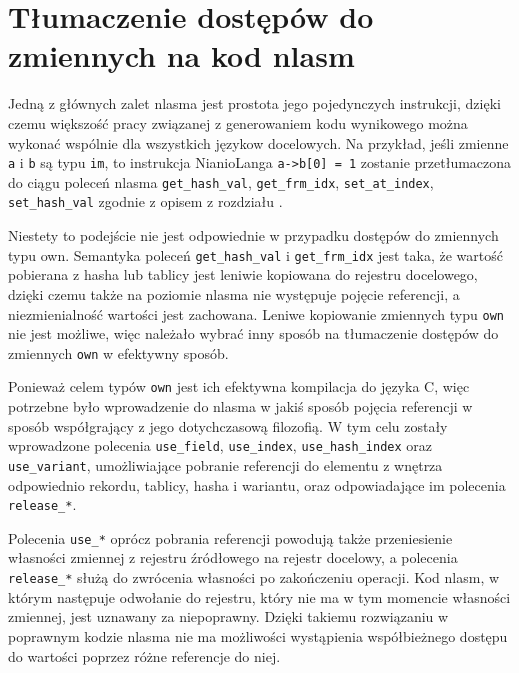 \documentclass[licencjacka]{pracamgr}
\begin{document}
\section{Tłumaczenie dostępów do zmiennych na kod nlasm}
Jedną z głównych zalet nlasma jest prostota jego pojedynczych instrukcji, dzięki czemu większość
pracy związanej z generowaniem kodu wynikowego można wykonać wspólnie dla wszystkich językow docelowych.
Na przykład, jeśli zmienne \texttt{a} i \texttt{b} są typu \texttt{im}, to instrukcja NianioLanga
\texttt{a->b[0] = 1} zostanie przetłumaczona do ciągu poleceń nlasma
\texttt{get\_hash\_val}, \texttt{get\_frm\_idx}, \texttt{set\_at\_index}, \texttt{set\_hash\_val} zgodnie
z opisem z rozdziału .

Niestety to podejście nie jest odpowiednie w przypadku dostępów do zmiennych typu own.
Semantyka poleceń \texttt{get\_hash\_val} i \texttt{get\_frm\_idx} jest taka, że wartość pobierana
z hasha lub tablicy jest leniwie kopiowana do rejestru docelowego, dzięki czemu także na poziomie nlasma
nie występuje pojęcie referencji, a niezmienialność wartości jest zachowana.
Leniwe kopiowanie zmiennych typu \texttt{own} nie jest możliwe, więc należało wybrać inny sposób na
tłumaczenie dostępów do zmiennych \texttt{own} w efektywny sposób.

Ponieważ celem typów \texttt{own} jest ich efektywna kompilacja do języka C, więc potrzebne było
wprowadzenie do nlasma w jakiś sposób pojęcia referencji w sposób współgrający z jego dotychczasową filozofią.
W tym celu zostały wprowadzone polecenia \texttt{use\_field}, \texttt{use\_index}, \texttt{use\_hash\_index} oraz
\texttt{use\_variant}, umożliwiające pobranie referencji do elementu z wnętrza odpowiednio rekordu, tablicy, hasha
i wariantu, oraz odpowiadające im polecenia \texttt{release\_*}.

Polecenia \texttt{use\_*} oprócz pobrania referencji powodują także przeniesienie własności zmiennej z rejestru
źródłowego na rejestr docelowy, a polecenia \texttt{release\_*} służą do zwrócenia własności po zakończeniu
operacji. Kod nlasm, w którym następuje odwołanie do rejestru, który nie ma w tym momencie własności zmiennej,
jest uznawany za niepoprawny. Dzięki takiemu rozwiązaniu w poprawnym kodzie nlasma nie ma możliwości wystąpienia
współbieżnego dostępu do wartości poprzez różne referencje do niej.
\end{document}
